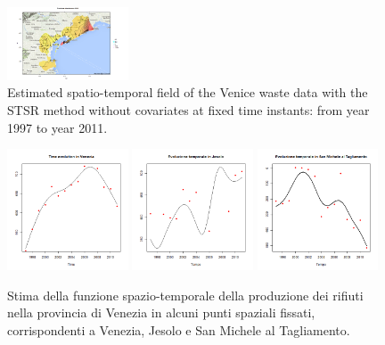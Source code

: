 \documentclass[a4paper,11pt,twoside,openright]{book}							%
\begin{document}
\begin{figure}[H]
\includegraphics[trim=0cm 0cm 4cm 0cm,clip=true,width=0.32\textwidth]{Immagini/venezia_con_covariate/Maps2011.png}
\caption{Estimated spatio-temporal field of the Venice waste data with the STSR method without covariates at fixed time instants: from year 1997 to year 2011.}
\label{fig:Vencovar_ris}
\end{figure}

\begin{figure}[H]
\centering
\includegraphics[width=0.32\textwidth]{Immagini/venezia_con_covariate/Venezia.png}
\includegraphics[width=0.32\textwidth]{Immagini/venezia_con_covariate/Jesolo.png}
\includegraphics[width=0.32\textwidth]{Immagini/venezia_con_covariate/SanMichelealTagliamento.png}
\caption{Stima della funzione spazio-temporale della produzione dei rifiuti nella provincia di Venezia in alcuni punti spaziali fissati, corrispondenti a Venezia, Jesolo e San Michele al Tagliamento.}
\label{fig:Vencovar_tempo}
\end{figure}
\end{document}
